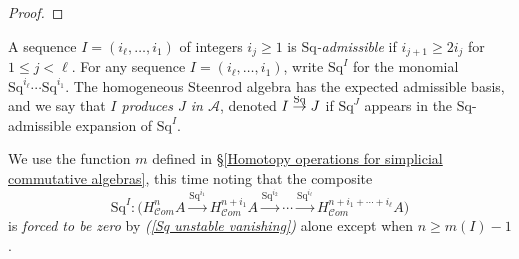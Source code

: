\documentclass[11pt]{amsart} \renewcommand{\baselinestretch}{1.2}
\theoremstyle{plain}
\theoremstyle{definition}
\renewcommand{\to}{\longrightarrow}
\newcommand{\scrC}{\mathscr{C}}
\newcommand{\calA}{\mathcal{A}}
\newcommand{\minDimDelta}{m}
\newcommand{\produces}[3]{#3:#1\sim #2}
\renewcommand{\produces}[3]{#1\rightarrow_{#3} #2}%
\renewcommand{\produces}[3]{#1\overset{\smash{#3}}{\rightarrow} #2}%
\newcommand{\Sq}{\mathrm{Sq}}
\newcommand{\LieSteen}{\calA}
\newcommand{\algs}{{\scrC\!\textit{om}}}
\begin{document}
\begin{Constructing cohomology operations}
\begin{proof}
\end{proof}
A sequence $I=(i_\ell,\ldots,i_1)$ of integers $i_j\geq1$ is \emph{$\Sq$-admissible} if $i_{j+1}\geq 2i_j$ for $1\leq j <\ell$. For any sequence $I=(i_\ell,\ldots,i_1)$, write $\Sq^I$ for the monomial $\Sq^{i_\ell}\cdots \Sq^{i_1}$. The homogeneous Steenrod algebra has the expected admissible basis, and we say that \emph{$I$ produces $J$ in $\LieSteen$}, denoted $\produces{I}{J}{\Sq}$ if $\Sq^J$ appears in the $\Sq$-admissible expansion of $\Sq^I$.

We use the function $\minDimDelta$ defined in \S\ref{Homotopy operations for simplicial commutative algebras}, this time  noting that the composite 
\[\Sq^I:\bigl(H_{\algs}^{n}A\overset{\Sq^{i_1}}{\to}H_{\algs}^{n+i_1}A\overset{\Sq^{i_2}}{\to}\cdots \overset{\Sq^{i_\ell}}{\to}H_{\algs}^{n+i_1+\cdots +i_\ell}A\bigr)\]
is \emph{forced to be zero} by \emph{(\ref{Sq unstable vanishing})} alone except  when $n\geq\minDimDelta(I)-1$.



\end{Constructing cohomology operations}
\end{document}
